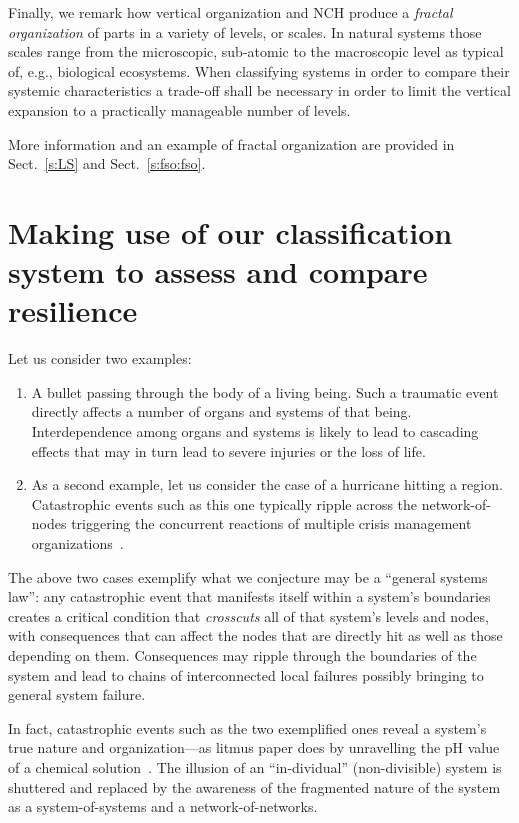 \documentclass[twocolumn]{svjour3}
\begin{document}
Finally, we remark how vertical organization and NCH produce a
\emph{fractal organization\/} of parts in a variety of levels, or scales. In
natural systems those scales range from the microscopic, sub-atomic 
to the macroscopic level as typical of, e.g., biological ecosystems.
When classifying systems in order to compare their systemic characteristics a trade-off
shall be necessary
in order to limit the vertical expansion to a practically manageable number of levels.

More information and an example of fractal organization are provided in Sect.~\ref{s:LS}
and Sect.~\ref{s:fso:fso}.


\section{Making use of our classification system to assess and compare resilience}\label{s:res}


Let us consider two examples:
\begin{enumerate}
\item A bullet passing through the body of a living being.
Such a traumatic event directly affects a number of organs and systems of that being.
Interdependence among organs and systems is likely to lead to cascading effects
that may in turn lead to severe injuries or the loss of life.
\item As a second example, let us consider the case of a hurricane hitting a region.
Catastrophic events such as this one typically ripple across the network-of-nodes
triggering the concurrent reactions of multiple crisis management organizations~\cite{CARRI3,RAND}.
\end{enumerate}

The above two cases exemplify what we conjecture may be a ``general systems law'':
any catastrophic event that manifests itself within a system's boundaries
creates a critical condition that \emph{crosscuts\/} all of that system's
levels and nodes, with consequences that can affect the nodes that are directly hit
as well as those depending on them. Consequences may ripple through the boundaries
of the system and lead to chains of interconnected local failures possibly bringing
to general system failure.

In fact, catastrophic events such as the two exemplified ones
reveal a system's true nature and organization---as litmus paper
does by unravelling the pH value of a chemical solution~\cite{Litmus}.
The illusion of an ``in-dividual'' (non-divisible) system is shuttered and replaced by the awareness
of the fragmented nature of the system as a system-of-systems and a network-of-networks.
\end{document}
